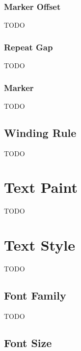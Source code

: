 \subsubsection{Marker Offset}\label{sec:markeroffset}


TODO


\subsubsection{Repeat Gap}\label{sec:repeatgap}


TODO


\subsubsection{Marker }\label{sec:markerpaint}


TODO


\subsection{Winding Rule}\label{sec:winding}


TODO


\section{Text Paint}\label{sec:textpaint}


TODO


\section{Text Style}\label{sec:textstyle}

TODO


\subsection{Font Family}\label{sec:fontfamily}


TODO


\subsection{Font Size}\label{sec:fontsize}

